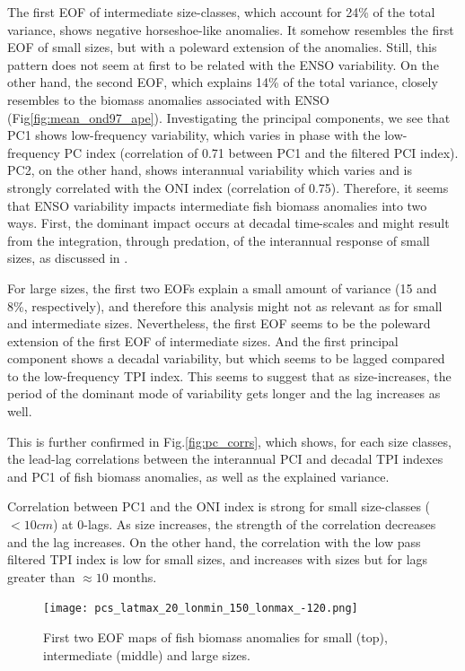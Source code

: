 The first EOF of intermediate size-classes, which account for 24\% of the total variance, shows negative horseshoe-like anomalies. It somehow resembles the first EOF of small sizes, but with a poleward extension of the anomalies. Still, this pattern does not seem at first to be related with the ENSO variability. On the other hand, the second EOF, which explains 14\% of the total variance, closely resembles to the biomass anomalies associated with ENSO (Fig\ref{fig:mean_ond97_ape}). Investigating the principal components, we see that PC1 shows low-frequency variability, which varies in phase with the low-frequency PC index (correlation of 0.71 between PC1 and the filtered PCI index). PC2, on the other hand, shows interannual variability which varies and is strongly correlated with the ONI index (correlation of 0.75). Therefore, it seems that ENSO variability impacts intermediate fish biomass anomalies into two ways. First, the dominant impact occurs at decadal time-scales and might result from the integration, through predation, of the interannual response of small sizes, as discussed in \cite{lorenzoDoubleintegrationHypothesisExplain2013}. 

For large sizes, the first two EOFs explain a small amount of variance (15 and 8\%, respectively), and therefore this analysis might not as relevant as for small and intermediate sizes. Nevertheless, the first EOF seems to be the poleward extension of the first EOF of intermediate sizes. And the first principal component shows a decadal variability, but which seems to be lagged compared to the low-frequency TPI index. This seems to suggest that as size-increases, the period of the dominant mode of variability gets longer and the lag increases as well.

This is further confirmed in Fig.\ref{fig:pc_corrs}, which shows, for each size classes, the lead-lag correlations between the interannual PCI and decadal TPI indexes and PC1 of fish biomass anomalies, as well as the explained variance. 

Correlation between PC1 and the ONI index is strong for small size-classes ($<10 cm$) at 0-lags. As size increases, the strength of the correlation decreases and the lag increases. On the other hand, the correlation with the low pass filtered TPI index is low for small sizes, and increases with sizes but for lags greater than $\approx 10$ months.

\begin{figure}
    \centering
    \texttt{[image: pcs\_latmax\_20\_lonmin\_150\_lonmax\_-120.png]}
    \caption{First two EOF maps of fish biomass anomalies for small (top), intermediate (middle) and large sizes.}
    \label{fig:eofpcs}
\end{figure}


